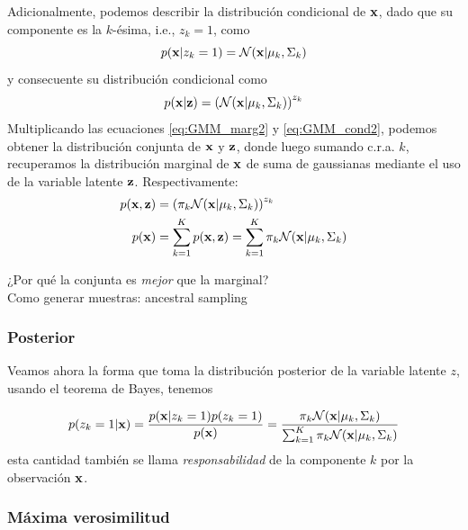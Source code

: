 Adicionalmente, podemos describir la distribución condicional de $\mathbf{x}$, dado que su componente es la $k$-ésima, i.e., $z_k=1$, como 
\begin{equation}
	p(\mathbf{x}|z_{k}=1) = {\mathcal N}(\mathbf{x}|\mu_k,\Sigma_k) \label{eq:GMM_cond1}
\end{equation}
y consecuente su distribución condicional como 
\begin{equation}
	p(\mathbf{x}|\mathbf{z}) = \left({\mathcal N}(\mathbf{x}|\mu_k,\Sigma_k)\right)^{z_k} \label{eq:GMM_cond2}
\end{equation}
Multiplicando las ecuaciones \eqref{eq:GMM_marg2} y \eqref{eq:GMM_cond2}, podemos obtener la distribución conjunta de $\mathbf{x}$ y $\mathbf{z}$, donde luego sumando  c.r.a. $k$, recuperamos la distribución marginal de $\mathbf{x}$ de suma de gaussianas mediante el uso de la variable latente $\mathbf{z}$. Respectivamente: 
\begin{align}
	p(\mathbf{x},\mathbf{z}) &= \left(\pi_k{\mathcal N}(\mathbf{x}|\mu_k,\Sigma_k)\right)^{z_k}\\
	p(\mathbf{x}) 	&= \sum_{k=1}^K p(\mathbf{x},\mathbf{z}) = \sum_{k=1}^K \pi_k {\mathcal N}(\mathbf{x}|\mu_k,\Sigma_k)
\end{align}

\begin{mdframed}[style=pendiente, frametitle={\center discusión}]
¿Por qué la conjunta es \emph{mejor} que la marginal?\\
Como generar muestras: ancestral sampling

\end{mdframed}


\subsubsection{Posterior} 
\label{sub:GMM_posterior}

Veamos ahora la forma que toma la distribución posterior de la variable latente $z$, usando el teorema de Bayes, tenemos 

\begin{align}
	p(z_k=1|\mathbf{x}) = \frac{p(\mathbf{x}|z_k=1)p(z_k=1)}{p(\mathbf{x})} = \frac{\pi_k {\mathcal N}(\mathbf{x}|\mu_k,\Sigma_k)}{\sum_{k=1}^K \pi_k {\mathcal N}(\mathbf{x}|\mu_k,\Sigma_k)} \label{eq:GMM_post1}
\end{align}
esta cantidad también se llama \emph{responsabilidad} de la componente $k$ por la observación $\mathbf{x}$.

\subsubsection{Máxima verosimilitud} 
\label{sub:GMM_ml}

